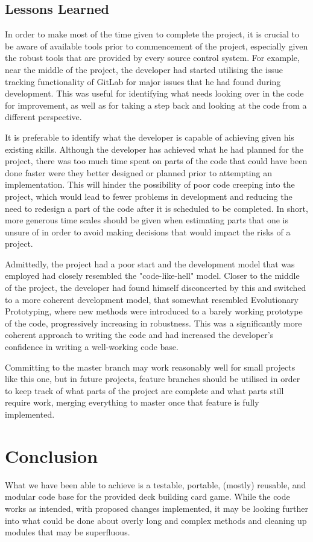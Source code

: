 \documentclass[12pt,a4paper,tightenlines]{article}
\begin{document}
\subsection{Lessons Learned}
In order to make most of the time given to complete the project, it is crucial
to be aware of available tools prior to commencement of the project, especially
given the robust tools that are provided by every source control system. For example,
near the middle of the project, the developer had started utilising the issue tracking
functionality of GitLab for major issues that he had found during development. This
was useful for identifying what needs looking over in the code for improvement, as
well as for taking a step back and looking at the code from a different perspective.

It is preferable to identify what the developer is capable of achieving given his
existing skills. Although the developer has achieved what he had planned for the
project, there was too much time spent on parts of the code that could have been
done faster were they better designed or planned prior to attempting an implementation.
This will hinder the possibility of poor code creeping into the project, which would
lead to fewer problems in development and reducing the need to redesign a part of the
code after it is scheduled to be completed. In short, more generous time scales should
be given when estimating parts that one is unsure of in order to avoid making decisions
that would impact the risks of a project.

Admittedly, the project had a poor start and the development model that was employed
had closely resembled the "code-like-hell" model. Closer to the middle of the project,
the developer had found himself disconcerted by this and switched to a more coherent
development model, that somewhat resembled Evolutionary Prototyping, where new methods
were introduced to a barely working prototype of the code, progressively increasing in
robustness. This was a significantly more coherent approach to writing the code and 
had increased the developer's confidence in writing a well-working code base.

Committing to the master branch may work reasonably well for small projects like this one,
but in future projects, feature branches should be utilised in order to keep track of
what parts of the project are complete and what parts still require work, merging
everything to master once that feature is fully implemented.
\section{Conclusion}
What we have been able to achieve is a testable, portable, (mostly) reusable,
and modular code base for the provided deck building card game. While the
code works as intended, with proposed changes implemented, it may be looking
further into what could be done about overly long and complex methods
and cleaning up modules that may be superfluous.

%
\end{document}
